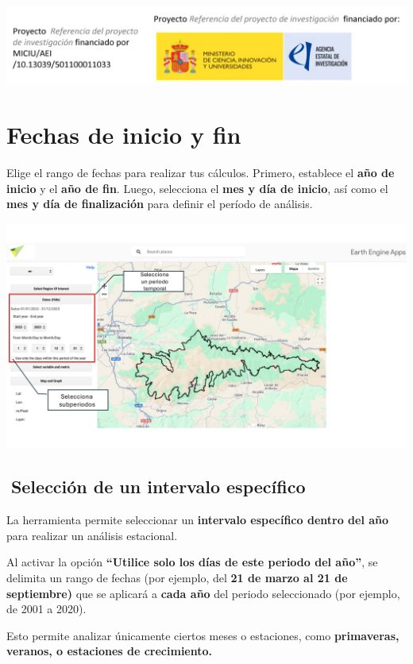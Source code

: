 \documentclass[
]{book}
\begin{document}
\includegraphics{assets/logo.jpeg}

\chapter{Fechas de inicio y fin}\label{fechas}

Elige el rango de fechas para realizar tus cálculos. Primero, establece el \textbf{año de inicio} y el \textbf{año de fin}. Luego, selecciona el \textbf{mes y día de inicio}, así como el \textbf{mes y día de finalización} para definir el período de análisis.

\includegraphics{assets/dates_es.png}

\section{\texorpdfstring{\textbf{📆Selección de un intervalo específico}}{📆Selección de un intervalo específico}}\label{selecciuxf3n-de-un-intervalo-especuxedfico}

La herramienta permite seleccionar un \textbf{intervalo específico dentro del año} para realizar un análisis estacional.

Al activar la opción \textbf{``Utilice solo los días de este periodo del año''}, se delimita un rango de fechas (por ejemplo, del \textbf{21 de marzo al 21 de septiembre)} que se aplicará a \textbf{cada año} del periodo seleccionado (por ejemplo, de 2001 a 2020).

Esto permite analizar únicamente ciertos meses o estaciones, como \textbf{primaveras, veranos, o estaciones de crecimiento.}
\end{document}
